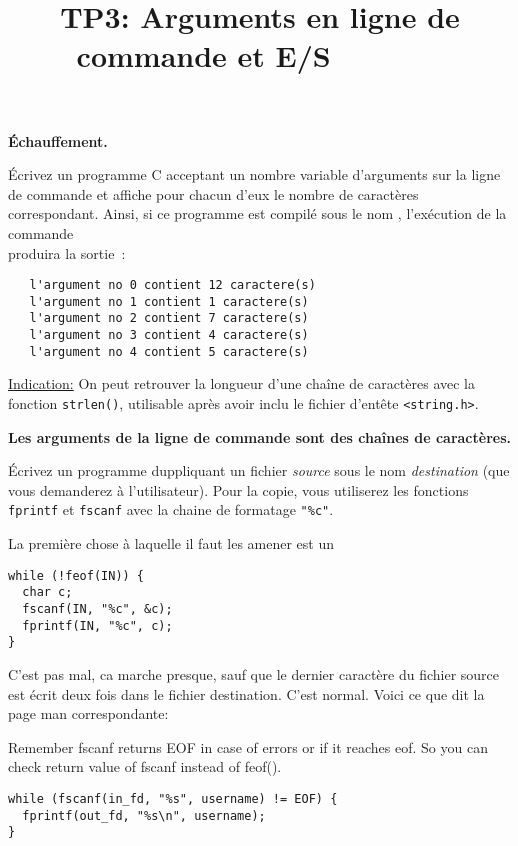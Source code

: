 \documentclass[10pt]{article}\usepackage[correction,nu]{esial}
\begin{document}
\title{TP3: Arguments en ligne de commande et E/S~~~~~~~}
\maketitle

\Exercice\textbf{Échauffement.}

\Question Écrivez un programme C acceptant un nombre variable d'arguments sur
la ligne de commande et affiche pour chacun d'eux le nombre de caractères
correspondant. Ainsi, si ce programme est compilé sous le nom
, l'exécution de la commande\\
 produira la sortie~:
\begin{verbatim}
   l'argument no 0 contient 12 caractere(s)
   l'argument no 1 contient 1 caractere(s)
   l'argument no 2 contient 7 caractere(s)
   l'argument no 3 contient 4 caractere(s)
   l'argument no 4 contient 5 caractere(s)
\end{verbatim}

\noindent\underline{Indication:} On peut retrouver la longueur d'une chaîne de
caractères avec la fonction \texttt{strlen()}, utilisable après avoir inclu le
fichier d'entête \texttt{<string.h>}.

\Exercice\textbf{Les arguments de la ligne de commande sont des chaînes
de caractères.}

\Question Écrivez un programme duppliquant un fichier \textit{source} sous le
nom \textit{destination} (que vous demanderez à l'utilisateur). Pour la copie,
vous utiliserez les fonctions \texttt{fprintf} et \texttt{fscanf} avec la
chaine de formatage \texttt{"\%c"}.

\begin{Reponse}
  La première chose à laquelle il faut les amener est un
  \begin{Verbatim}
while (!feof(IN)) {
  char c;
  fscanf(IN, "%c", &c);
  fprintf(IN, "%c", c);    
}
  \end{Verbatim}
  C'est pas mal, ca marche presque, sauf que le dernier caractère du fichier
  source est écrit deux fois dans le fichier destination. C'est normal. Voici
  ce que dit la page man correspondante:

  Remember fscanf returns EOF in case of errors or if it reaches eof. So you
  can check return value of fscanf instead of feof().
\begin{Verbatim}
while (fscanf(in_fd, "%s", username) != EOF) {
  fprintf(out_fd, "%s\n", username);
}  
\end{Verbatim}

\end{Reponse}
\end{document}
